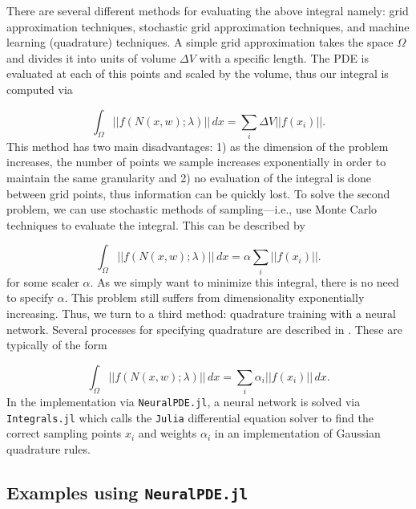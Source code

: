\documentclass{CUP-JNL-DTM}%
\theoremstyle{definition}
\numberwithin{equation}{section}
\newcommand{\Julia}{\texttt{Julia} }
\begin{document}
There are several different methods for evaluating the above integral namely: grid approximation techniques, stochastic grid approximation techniques, and machine learning (quadrature) techniques. A simple grid approximation takes the space $\Omega$ and divides it into units of volume $\Delta V$ with a specific length. The PDE is evaluated at each of this points and scaled by the volume, thus our integral is computed via 

\begin{equation}
	\int_{\Omega} ||f(N(x,w); \lambda)||\,dx = \sum_i \Delta V ||f(x_i)||.
\end{equation}
This method has two main disadvantages: 1) as the dimension of the problem increases, the number of points we sample increases exponentially in order to maintain the same granularity and 2) no evaluation of the integral is done between grid points, thus information can be quickly lost. To solve the second problem, we can use stochastic methods of sampling---i.e., use Monte Carlo techniques to evaluate the integral. This can be described by 

\begin{equation}
	\int_{\Omega} ||f(N(x,w); \lambda)||\,dx = \alpha \sum_i ||f(x_i)||.
\end{equation}
for some scaler $\alpha$. As we simply want to minimize this integral, there is no need to specify $\alpha$. This problem still suffers from dimensionality exponentially increasing. Thus, we turn to a third method: quadrature training with a neural network. Several processes for specifying quadrature are described in \cite{riveraQuadratureRulesSolving2022}. These are typically of the form 

\begin{equation}
	\int_{\Omega} ||f(N(x,w); \lambda)||\,dx = \sum_i \alpha_i ||f(x_i)||\,dx.
\end{equation}
In the implementation via \texttt{NeuralPDE.jl}, a neural network is solved via \texttt{Integrals.jl} which calls the \Julia differential equation solver \cite{rackauckasDifferentialEquationsJlPerformant2017} to find the correct sampling points $x_i$ and weights $\alpha_i$ in an implementation of Gaussian quadrature rules. 

\subsection{Examples using \texttt{NeuralPDE.jl}}
\end{document}

